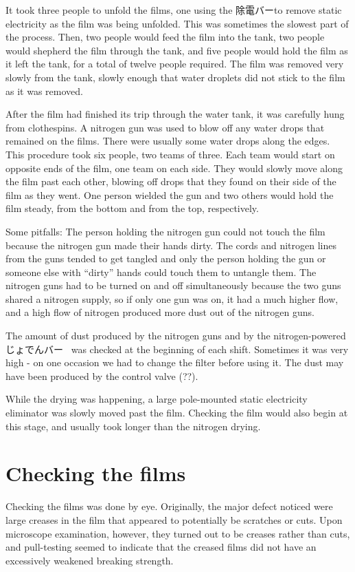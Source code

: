 \documentclass{article}
\begin{document}
It took three people to unfold the films, one using the 除電バーto remove static electricity as the film was being unfolded. This was sometimes the slowest part of the process. Then, two people would feed the film into the tank, two people would shepherd the film through the tank, and five people would hold the film as it left the tank, for a total of twelve people required. The film was removed very slowly from the tank, slowly enough that water droplets did not stick to the film as it was removed. 

After the film had finished its trip through the water tank, it was carefully hung from clothespins. A nitrogen gun was used to blow off any water drops that remained on the films. There were usually some water drops along the edges. This procedure took six people, two teams of three. Each team would start on opposite ends of the film, one team on each side. They would slowly move along the film past each other, blowing off drops that they found on their side of the film as they went. One person wielded the gun and two others would hold the film steady, from the bottom and from the top, respectively. 

Some pitfalls: The person holding the nitrogen gun could not touch the film because the nitrogen gun made their hands dirty. The cords and nitrogen lines from the guns tended to get tangled and only the person holding the gun or someone else with ``dirty'' hands could touch them to untangle them.  The nitrogen guns had to be turned on and off simultaneously because the two guns shared a nitrogen supply, so if only one gun was on, it had a much higher flow, and a high flow of nitrogen produced more dust out of the nitrogen guns.  

The amount of dust produced by the nitrogen guns and by the nitrogen-powered じょでんバー\mbox{ } was checked at the beginning of each shift. Sometimes it was very high - on one occasion we had to change the filter before using it. The dust may have been produced by the control valve (??). 

While the drying was happening, a large pole-mounted static electricity eliminator was slowly moved past the film.  Checking the film would also begin at this stage, and usually took longer than the nitrogen drying. 

\section{Checking the films}
Checking the films was done by eye. Originally, the major defect noticed were large creases in the film that appeared to potentially be scratches or cuts. Upon microscope examination, however, they turned out to be creases rather than cuts, and pull-testing seemed to indicate that the creased films did not have an excessively weakened breaking strength. 
\end{document}
